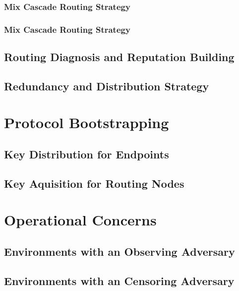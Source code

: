 \subsection{Mix Cascade Routing Strategy}

\subsection{Mix Cascade Routing Strategy}

\section{Routing Diagnosis and Reputation Building\label{sec:diagnosisOfMessagePath}}

\section{Redundancy and Distribution Strategy}

\chapter{Protocol Bootstrapping\label{sec:keyDistribution}}

\section{Key Distribution for Endpoints}

\section{Key Aquisition for Routing Nodes}


\chapter{Operational Concerns} 

\section{Environments with an Observing Adversary}

\section{Environments with an Censoring Adversary}

